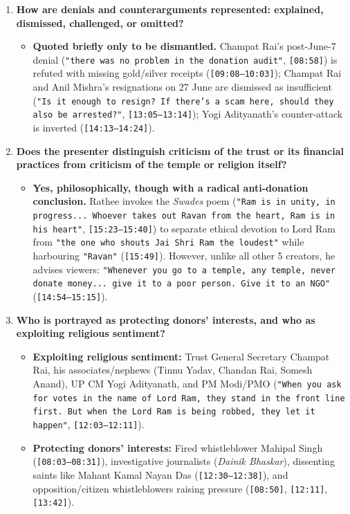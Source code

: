 \documentclass[10pt,a4paper]{article}
\begin{document}
\begin{enumerate}[leftmargin=1.6em, itemsep=4pt, topsep=4pt]
\begin{itemize}[leftmargin=1.4em, itemsep=2pt, topsep=2pt]
  \end{itemize}
  \item \textbf{How are denials and counterarguments represented: explained, dismissed, challenged, or omitted?}
  \begin{itemize}[leftmargin=1.4em, itemsep=2pt, topsep=2pt]
    \item \textbf{Quoted briefly only to be dismantled.} Champat Rai's post-June-7 denial (\texttt{"there was no problem in the donation audit"}, \texttt{[08:58]}) is refuted with missing gold/silver receipts (\texttt{[09:08--10:03]}); Champat Rai and Anil Mishra's resignations on 27 June are dismissed as insufficient (\texttt{"Is it enough to resign? If there's a scam here, should they also be arrested?"}, \texttt{[13:05--13:14]}); Yogi Adityanath's counter-attack is inverted (\texttt{[14:13--14:24]}).
  \end{itemize}
  \item \textbf{Does the presenter distinguish criticism of the trust or its financial practices from criticism of the temple or religion itself?}
  \begin{itemize}[leftmargin=1.4em, itemsep=2pt, topsep=2pt]
    \item \textbf{Yes, philosophically, though with a radical anti-donation conclusion.} Rathee invokes the \textit{Swades} poem (\texttt{"Ram is in unity, in progress... Whoever takes out Ravan from the heart, Ram is in his heart"}, \texttt{[15:23--15:40]}) to separate ethical devotion to Lord Ram from \texttt{"the one who shouts Jai Shri Ram the loudest"} while harbouring \texttt{"Ravan"} (\texttt{[15:49]}). However, unlike all other 5 creators, he advises viewers: \texttt{"Whenever you go to a temple, any temple, never donate money... give it to a poor person. Give it to an NGO"} (\texttt{[14:54--15:15]}).
  \end{itemize}
  \item \textbf{Who is portrayed as protecting donors' interests, and who as exploiting religious sentiment?}
  \begin{itemize}[leftmargin=1.4em, itemsep=2pt, topsep=2pt]
    \item \textbf{Exploiting religious sentiment:} Trust General Secretary Champat Rai, his associates/nephews (Tinnu Yadav, Chandan Rai, Somesh Anand), UP CM Yogi Adityanath, and PM Modi/PMO (\texttt{"When you ask for votes in the name of Lord Ram, they stand in the front line first. But when the Lord Ram is being robbed, they let it happen"}, \texttt{[12:03--12:11]}).
    \item \textbf{Protecting donors' interests:} Fired whistleblower Mahipal Singh (\texttt{[08:03--08:31]}), investigative journalists (\textit{Dainik Bhaskar}), dissenting saints like Mahant Kamal Nayan Das (\texttt{[12:30--12:38]}), and opposition/citizen whistleblowers raising pressure (\texttt{[08:50]}, \texttt{[12:11]}, \texttt{[13:42]}).
  \end{itemize}
\end{enumerate}
\end{document}
